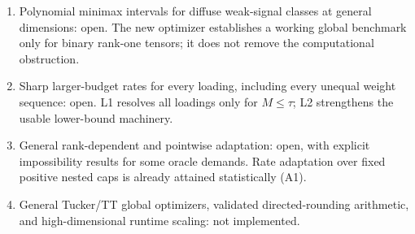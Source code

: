 \begin{enumerate}
\def\labelenumi{\arabic{enumi}.}
\tightlist
\item
  Polynomial minimax intervals for diffuse weak-signal classes at
  general dimensions: open. The new optimizer establishes a working
  global benchmark only for binary rank-one tensors; it does not remove
  the computational obstruction.
\item
  Sharp larger-budget rates for every loading, including every unequal
  weight sequence: open. L1 resolves all loadings only for \(M\le\tau\);
  L2 strengthens the usable lower-bound machinery.
\item
  General rank-dependent and pointwise adaptation: open, with explicit
  impossibility results for some oracle demands. Rate adaptation over
  fixed positive nested caps is already attained statistically (A1).
\item
  General Tucker/TT global optimizers, validated directed-rounding
  arithmetic, and high-dimensional runtime scaling: not implemented.
\end{enumerate}
